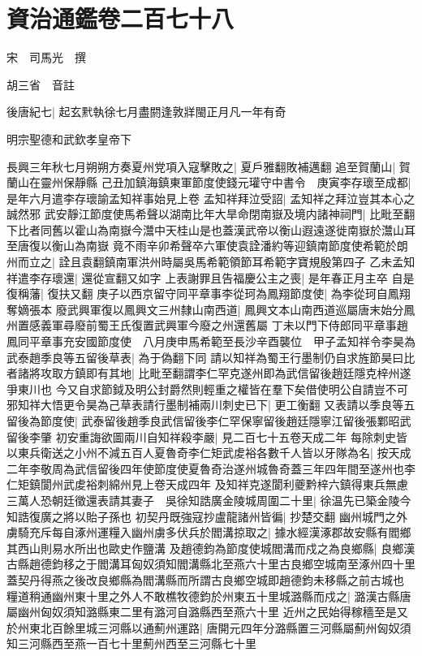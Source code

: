 \chapter{資治通鑑卷二百七十八}
宋　司馬光　撰

胡三省　音註

後唐紀七|{
	起玄黓執徐七月盡閼逢敦牂閩正月凡一年有奇}


明宗聖德和武欽孝皇帝下

長興三年秋七月朔朔方奏夏州党項入寇擊敗之|{
	夏戶雅翻敗補邁翻}
追至賀蘭山|{
	賀蘭山在靈州保靜縣}
己丑加鎮海鎮東軍節度使錢元瓘守中書令　庚寅李存瓌至成都|{
	是年六月遣李存瓌諭孟知祥事始見上卷}
孟知祥拜泣受詔|{
	孟知祥之拜泣豈其本心之誠然邪}
武安靜江節度使馬希聲以湖南比年大旱命閉南嶽及境内諸神祠門|{
	比毗至翻下比者同舊以霍山為南嶽今灊中天桂山是也蓋漢武帝以衡山遐遠遂徙南嶽於灊山耳至唐復以衡山為南嶽}
竟不雨辛卯希聲卒六軍使袁詮潘約等迎鎮南節度使希範於朗州而立之|{
	詮且袁翻鎮南軍洪州時屬吳馬希範領節耳希範字寶規殷第四子}
乙未孟知祥遣李存瓌還|{
	還從宣翻又如字}
上表謝罪且告福慶公主之喪|{
	是年春正月主卒}
自是復稱藩|{
	復扶又翻}
庚子以西京留守同平章事李從珂為鳳翔節度使|{
	為李從珂自鳳翔奪嫡張本}
廢武興軍復以鳳興文三州隸山南西道|{
	鳳興文本山南西道巡屬唐末始分鳳州置感義軍尋廢前蜀王氏復置武興軍今廢之州還舊屬}
丁未以門下侍郎同平章事趙鳳同平章事充安國節度使　八月庚申馬希範至長沙辛酉襲位　甲子孟知祥令李昊為武泰趙季良等五留後草表|{
	為于偽翻下同}
請以知祥為蜀王行墨制仍自求旌節昊曰比者諸將攻取方鎮即有其地|{
	比毗至翻謂李仁罕克遂州即為武信留後趙廷隱克梓州遂爭東川也}
今又自求節鉞及明公封爵然則輕重之權皆在羣下矣借使明公自請豈不可邪知祥大悟更令昊為己草表請行墨制補兩川刺史已下|{
	更工衡翻}
又表請以季良等五留後為節度使|{
	武泰留後趙季良武信留後李仁罕保寧留後趙廷隱寧江留後張鄴昭武留後李肇}
初安重誨欲圖兩川自知祥殺李嚴|{
	見二百七十五卷天成二年}
每除刺史皆以東兵衛送之小州不減五百人夏魯奇李仁矩武䖍裕各數千人皆以牙隊為名|{
	按天成二年李敬周為武信留後四年使節度使夏魯奇治遂州城魯奇蓋三年四年間至遂州也李仁矩鎮閬州武䖍裕刺綿州見上卷天成四年}
及知祥克遂閬利夔黔梓六鎮得東兵無慮三萬人恐朝廷徵還表請其妻子　吳徐知誥廣金陵城周圍二十里|{
	徐温先已築金陵今知誥復廣之將以貽子孫也}
初契丹既強寇抄盧龍諸州皆徧|{
	抄楚交翻}
幽州城門之外虜騎充斥每自涿州運糧入幽州虜多伏兵於閻溝掠取之|{
	據水經漢涿郡故安縣有閻鄉其西山則易水所出也歐史作鹽溝}
及趙德鈞為節度使城閻溝而戍之為良鄉縣|{
	良鄉漢古縣趙德鈞移之于閻溝耳匈奴須知閻溝縣北至燕六十里古良鄉空城南至涿州四十里蓋契丹得燕之後改良鄉縣為閻溝縣而所謂古良鄉空城即趙德鈞未移縣之前古城也}
糧道稍通幽州東十里之外人不敢樵牧德鈞於州東五十里城潞縣而戍之|{
	潞漢古縣唐屬幽州匈奴須知潞縣東二里有潞河自潞縣西至燕六十里}
近州之民始得稼穡至是又於州東北百餘里城三河縣以通薊州運路|{
	唐開元四年分潞縣置三河縣屬薊州匈奴須知三河縣西至燕一百七十里薊州西至三河縣七十里}
